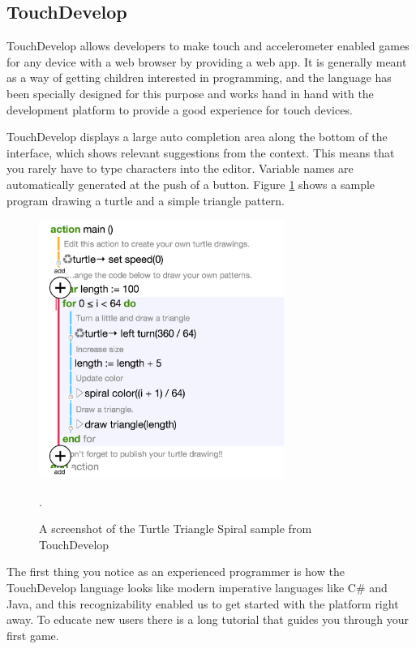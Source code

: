 \subsection{TouchDevelop}
\label{subsub:TouchDevelop}
TouchDevelop allows developers to make touch and accelerometer enabled games for any device with a web browser by providing a web app. It is generally meant as a way of getting children interested in programming, and the language has been specially designed for this purpose and works hand in hand with the development platform to provide a good experience for touch devices.

TouchDevelop displays a large auto completion area along the bottom of the interface, which shows relevant suggestions from the context. 
This means that you rarely have to type characters into the editor. 
Variable names are automatically generated at the push of a button.
Figure \ref{fig:TouchDevelop_screenshot} shows a sample program drawing a
turtle and a simple triangle pattern.

\begin{figure}
	\centering
		\includegraphics[width=80mm]{diagrams/TouchDevelop_screenshot.png}
	\caption{A screenshot of the Turtle Triangle Spiral sample from
	TouchDevelop\,\cite{TouchDevelop:TurtleTriangleSpiral}}.
\label{fig:TouchDevelop_screenshot}
\end{figure}

The first thing you notice as an experienced programmer is how the TouchDevelop language looks like modern imperative languages like C\# and Java, and this recognizability enabled us to get started with the platform right away. 
To educate new users there is a long tutorial that guides you through your first game. 

